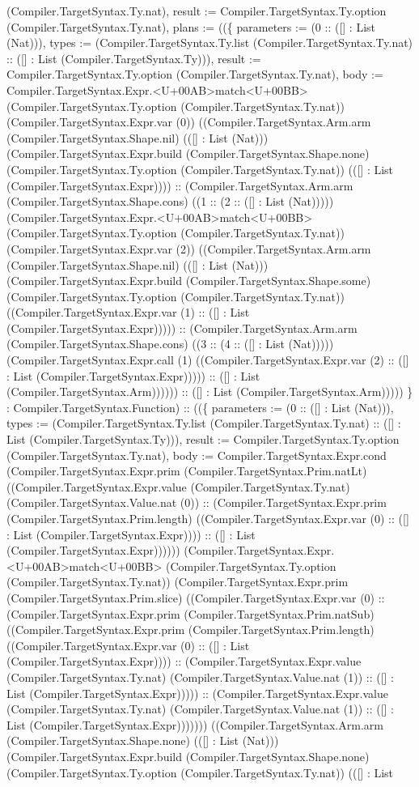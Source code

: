 \documentclass[11pt]{article}
\begin{document}
(Compiler.TargetSyntax.Ty.nat), result := Compiler.TargetSyntax.Ty.option (Compiler.TargetSyntax.Ty.nat), plans := ((\{ parameters := (0 :: ([] : List (Nat))), types := (Compiler.TargetSyntax.Ty.list (Compiler.TargetSyntax.Ty.nat) :: ([] : List (Compiler.TargetSyntax.Ty))), result := Compiler.TargetSyntax.Ty.option (Compiler.TargetSyntax.Ty.nat), body := Compiler.TargetSyntax.Expr.<U+00AB>match<U+00BB> (Compiler.TargetSyntax.Ty.option (Compiler.TargetSyntax.Ty.nat)) (Compiler.TargetSyntax.Expr.var (0)) ((Compiler.TargetSyntax.Arm.arm (Compiler.TargetSyntax.Shape.nil) (([] : List (Nat))) (Compiler.TargetSyntax.Expr.build (Compiler.TargetSyntax.Shape.none) (Compiler.TargetSyntax.Ty.option (Compiler.TargetSyntax.Ty.nat)) (([] : List (Compiler.TargetSyntax.Expr)))) :: (Compiler.TargetSyntax.Arm.arm (Compiler.TargetSyntax.Shape.cons) ((1 :: (2 :: ([] : List (Nat))))) (Compiler.TargetSyntax.Expr.<U+00AB>match<U+00BB> (Compiler.TargetSyntax.Ty.option (Compiler.TargetSyntax.Ty.nat)) (Compiler.TargetSyntax.Expr.var (2)) ((Compiler.TargetSyntax.Arm.arm (Compiler.TargetSyntax.Shape.nil) (([] : List (Nat))) (Compiler.TargetSyntax.Expr.build (Compiler.TargetSyntax.Shape.some) (Compiler.TargetSyntax.Ty.option (Compiler.TargetSyntax.Ty.nat)) ((Compiler.TargetSyntax.Expr.var (1) :: ([] : List (Compiler.TargetSyntax.Expr))))) :: (Compiler.TargetSyntax.Arm.arm (Compiler.TargetSyntax.Shape.cons) ((3 :: (4 :: ([] : List (Nat))))) (Compiler.TargetSyntax.Expr.call (1) ((Compiler.TargetSyntax.Expr.var (2) :: ([] : List (Compiler.TargetSyntax.Expr))))) :: ([] : List (Compiler.TargetSyntax.Arm)))))) :: ([] : List (Compiler.TargetSyntax.Arm))))) \} : Compiler.TargetSyntax.Function) :: ((\{ parameters := (0 :: ([] : List (Nat))), types := (Compiler.TargetSyntax.Ty.list (Compiler.TargetSyntax.Ty.nat) :: ([] : List (Compiler.TargetSyntax.Ty))), result := Compiler.TargetSyntax.Ty.option (Compiler.TargetSyntax.Ty.nat), body := Compiler.TargetSyntax.Expr.cond (Compiler.TargetSyntax.Expr.prim (Compiler.TargetSyntax.Prim.natLt) ((Compiler.TargetSyntax.Expr.value (Compiler.TargetSyntax.Ty.nat) (Compiler.TargetSyntax.Value.nat (0)) :: (Compiler.TargetSyntax.Expr.prim (Compiler.TargetSyntax.Prim.length) ((Compiler.TargetSyntax.Expr.var (0) :: ([] : List (Compiler.TargetSyntax.Expr)))) :: ([] : List (Compiler.TargetSyntax.Expr)))))) (Compiler.TargetSyntax.Expr.<U+00AB>match<U+00BB> (Compiler.TargetSyntax.Ty.option (Compiler.TargetSyntax.Ty.nat)) (Compiler.TargetSyntax.Expr.prim (Compiler.TargetSyntax.Prim.slice) ((Compiler.TargetSyntax.Expr.var (0) :: (Compiler.TargetSyntax.Expr.prim (Compiler.TargetSyntax.Prim.natSub) ((Compiler.TargetSyntax.Expr.prim (Compiler.TargetSyntax.Prim.length) ((Compiler.TargetSyntax.Expr.var (0) :: ([] : List (Compiler.TargetSyntax.Expr)))) :: (Compiler.TargetSyntax.Expr.value (Compiler.TargetSyntax.Ty.nat) (Compiler.TargetSyntax.Value.nat (1)) :: ([] : List (Compiler.TargetSyntax.Expr))))) :: (Compiler.TargetSyntax.Expr.value (Compiler.TargetSyntax.Ty.nat) (Compiler.TargetSyntax.Value.nat (1)) :: ([] : List (Compiler.TargetSyntax.Expr))))))) ((Compiler.TargetSyntax.Arm.arm (Compiler.TargetSyntax.Shape.none) (([] : List (Nat))) (Compiler.TargetSyntax.Expr.build (Compiler.TargetSyntax.Shape.none) (Compiler.TargetSyntax.Ty.option (Compiler.TargetSyntax.Ty.nat)) (([] : List 
\end{document}
